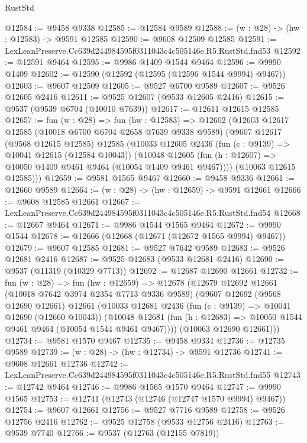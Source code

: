 \begin{lexlean}{RustStd}
\begin{coremodule}
@12584 := @9458 @9338
@12585 := @12584 @9589
@12588 := (w : @28) -> (hw : @12583) -> @9591 @12585
@12590 := @9608 @12509 @12585
@12591 := LexLeanPreserve.Cc639d244984595f0311043c4c505146e.R5.RustStd.fnd53
@12592 := @12591 @9464
@12595 := @9986 @1409 @1544 @9464
@12596 := @9990 @1409
@12602 := @12590 (@12592 (@12595 (@12596 @1544 @9994) @9467))
@12603 := @9607 @12509
@12605 := @9527 @6700 @9589
@12607 := @9526 @12605 @2416
@12611 := @9525 @12607 (@9533 @12605 @2416)
@12615 := @9537 (@9539 @6704 (@10010 @7639))
@12617 := @12611 @12615 @12585
@12657 := fun (w : @28) =>
  fun (hw : @12583) =>
  @12602
    (@12603
      @12617
      @12585
      (@10018 @6700 @6704 @2658 @7639 @9338 @9589)
      (@9607
        @12617
        (@9568 @12615 @12585)
        @12585
        (@10033
          @12605
          @2436
          (fun (c : @9139) => @10041 @12615 (@12584 @10043))
          (@10048 @12605 (fun (h : @12607) => @10050 @1409 @9461 @9464 (@10054 @1409 @9461 @9467))))
        (@10063 @12615 @12585)))
@12659 := @9581 @1565 @9467
@12660 := @9458 @9336
@12661 := @12660 @9589
@12664 := (w : @28) -> (hw : @12659) -> @9591 @12661
@12666 := @9608 @12585 @12661
@12667 := LexLeanPreserve.Cc639d244984595f0311043c4c505146e.R5.RustStd.fnd54
@12668 := @12667 @9464
@12671 := @9986 @1544 @1565 @9464
@12672 := @9990 @1544
@12678 := @12666 (@12668 (@12671 (@12672 @1565 @9994) @9467))
@12679 := @9607 @12585
@12681 := @9527 @7642 @9589
@12683 := @9526 @12681 @2416
@12687 := @9525 @12683 (@9533 @12681 @2416)
@12690 := @9537 (@11319 (@10329 @7713))
@12692 := @12687 @12690 @12661
@12732 := fun (w : @28) =>
  fun (hw : @12659) =>
  @12678
    (@12679
      @12692
      @12661
      (@10018 @7642 @3974 @2354 @7713 @9336 @9589)
      (@9607
        @12692
        (@9568 @12690 @12661)
        @12661
        (@10033
          @12681
          @2436
          (fun (c : @9139) => @10041 @12690 (@12660 @10043))
          (@10048 @12681 (fun (h : @12683) => @10050 @1544 @9461 @9464 (@10054 @1544 @9461 @9467))))
        (@10063 @12690 @12661)))
@12734 := @9581 @1570 @9467
@12735 := @9458 @9334
@12736 := @12735 @9589
@12739 := (w : @28) -> (hw : @12734) -> @9591 @12736
@12741 := @9608 @12661 @12736
@12742 := LexLeanPreserve.Cc639d244984595f0311043c4c505146e.R5.RustStd.fnd55
@12743 := @12742 @9464
@12746 := @9986 @1565 @1570 @9464
@12747 := @9990 @1565
@12753 := @12741 (@12743 (@12746 (@12747 @1570 @9994) @9467))
@12754 := @9607 @12661
@12756 := @9527 @7716 @9589
@12758 := @9526 @12756 @2416
@12762 := @9525 @12758 (@9533 @12756 @2416)
@12763 := @9539 @7740
@12766 := @9537 (@12763 (@12155 @7819))

\end{coremodule}
\end{lexlean}
